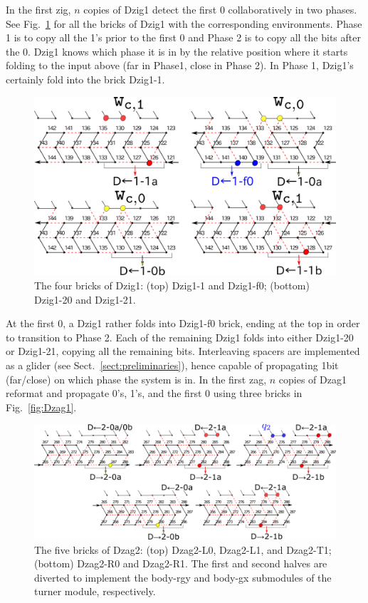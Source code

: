 \documentclass[runningheads]{llncs}
\begin{document}
In the first zig, $n$ copies of Dzig1 detect the first 0 collaboratively in two phases. 
See Fig.~\ref{fig:DFAO-zig1} for all the bricks of Dzig1 with the corresponding environments. 
Phase 1 is to copy all the 1's prior to the first 0 and Phase 2 is to copy all the bits after the 0. 
Dzig1 knows which phase it is in by the relative position where it starts folding to the input above (far in Phase1, close in Phase 2). 
In Phase 1, Dzig1's certainly fold into the brick Dzig1-1. 
%
\begin{figure}
\centering
\includegraphics[width=\linewidth]{Figs/DFAO-zig1.png}  
\caption{The four bricks of Dzig1: (top) Dzig1-1 and Dzig1-f0; (bottom) Dzig1-20 and Dzig1-21.}
\label{fig:DFAO-zig1}
\vspace*{-3mm}
\end{figure}
%
At the first 0, a Dzig1 rather folds into Dzig1-f0 brick, ending at the top in order to transition to Phase 2. 
Each of the remaining Dzig1 folds into either Dzig1-20 or Dzig1-21, copying all the remaining bits. 
Interleaving spacers are implemented as a glider (see Sect.~\ref{sect:preliminaries}), hence capable of propagating 1bit (far/close) on which phase the system is in. 
In the first zag, $n$ copies of Dzag1 reformat and propagate 0's, 1's, and the first 0 using three bricks in Fig.~\ref{fig:Dzag1}.

\begin{figure}[tb]
\centering
\includegraphics[width=\linewidth]{Figs/DFAO-zag2.png}  
\caption{The five bricks of Dzag2: (top) Dzag2-L0, Dzag2-L1, and Dzag2-T1; (bottom) Dzag2-R0 and Dzag2-R1. 
The first and second halves are diverted to implement the body-rgy and body-gx submodules of the turner module, respectively.}
\label{fig:Dzag2}
\end{figure}
\end{document}
